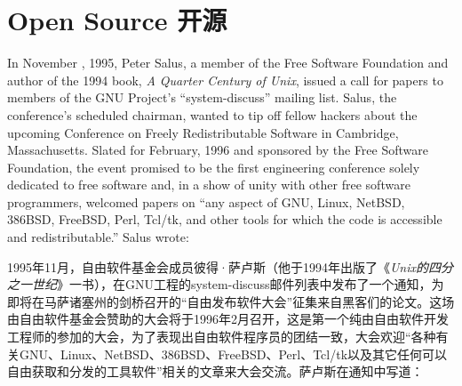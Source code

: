 
\chapter{\ifdefined\eng
Open Source
\fi
\ifdefined\chs
开源
\fi} \label{chapter:open source}



\ifdefined\eng
In November , 1995, Peter Salus, a member of the Free Software Foundation and author of the 1994 book, \textit{A Quarter Century of Unix}, issued a call for papers to members of the GNU Project's ``system-discuss'' mailing list. Salus, the conference's scheduled chairman, wanted to tip off fellow hackers about the upcoming Conference on Freely Redistributable Software in Cambridge, Massachusetts. Slated for February, 1996 and sponsored by the Free Software Foundation, the event promised to be the first engineering conference solely dedicated to free software and, in a show of unity with other free software programmers, welcomed papers on ``any aspect of GNU, Linux, NetBSD, 386BSD, FreeBSD, Perl, Tcl/tk, and other tools for which the code is accessible and redistributable.'' Salus wrote:
\fi

\ifdefined\chs
1995年11月，自由软件基金会成员彼得·萨卢斯（他于1994年出版了《\textit{Unix的四分之一世纪}》一书），在GNU工程的system-discuss邮件列表中发布了一个通知，为即将在马萨诸塞州的剑桥召开的``自由发布软件大会''征集来自黑客们的论文。这场由自由软件基金会赞助的大会将于1996年2月召开，这是第一个纯由自由软件开发工程师的参加的大会，为了表现出自由软件程序员的团结一致，大会欢迎``各种有关GNU、Linux、NetBSD、386BSD、FreeBSD、Perl、Tcl/tk以及其它任何可以自由获取和分发的工具软件''相关的文章来大会交流。萨卢斯在通知中写道：
\fi

